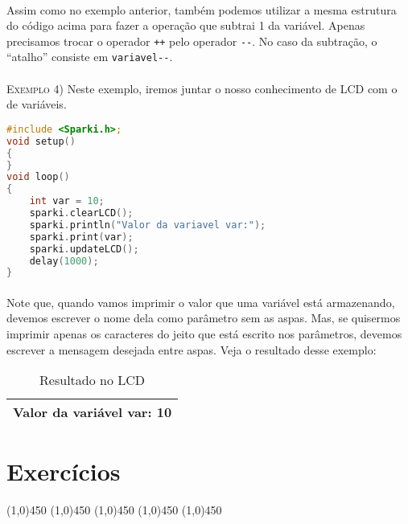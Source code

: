 \paragraph{}
Assim como no exemplo anterior, também podemos utilizar a mesma estrutura do código acima para fazer a operação que subtrai 1 da variável. Apenas precisamos trocar o operador \lstinline[columns=fixed]{++} pelo operador \lstinline[columns=fixed]{--}. No caso da subtração, o ``atalho'' consiste em \lstinline[columns=fixed]{variavel--}.
\\~\\

\textsc{Exemplo 4)} Neste exemplo, iremos juntar o nosso conhecimento de LCD com o de variáveis.
\begin{lstlisting}[language=C]
#include <Sparki.h>;
void setup()
{
}
void loop()
{
    int var = 10;
    sparki.clearLCD();
    sparki.println("Valor da variavel var:");
    sparki.print(var);
    sparki.updateLCD();
    delay(1000);  
}
\end{lstlisting}

\paragraph{}
Note que, quando vamos imprimir o valor que uma variável está armazenando, devemos escrever o nome dela como parâmetro sem as aspas. Mas, se quisermos imprimir apenas os caracteres do jeito que está escrito nos parâmetros, devemos escrever a mensagem desejada entre aspas. Veja o resultado desse exemplo:

\begin{table}[h]
 \centering
 {\renewcommand\arraystretch{1.5}
 \caption{Resultado no LCD}
 \begin{tabular}{ l }
  \cline{1-1}  
    \multicolumn{1}{|p{4cm}|}{Valor da variável var:       10}
  \\  
  \hline
 \end{tabular} }
\end{table}

\section{Exercícios}


\begin{center}
    \line(1,0){450}
    \vspace{0.2cm}   
    \line(1,0){450}
    \vspace{0.2cm}   
    \line(1,0){450}
    \vspace{0.2cm}   
    \line(1,0){450}
    \vspace{0.2cm}   
    \line(1,0){450}
    \vspace{0.4cm} 
\end{center}

